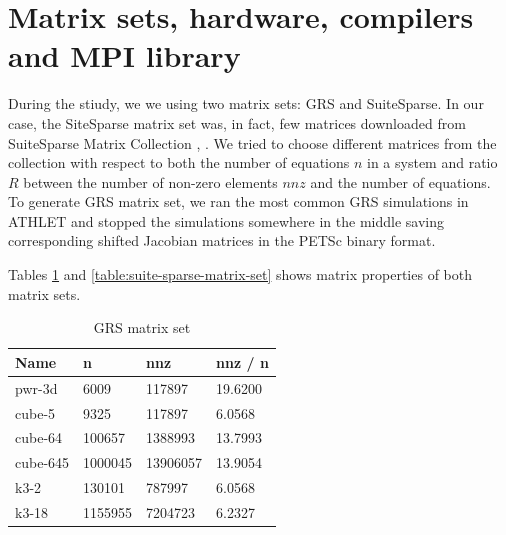 \section{Matrix sets, hardware, compilers and MPI library} \label{subseq:matrix-sets-and-hardware}

During the stiudy, we we using two matrix sets: GRS and SuiteSparse. In our case, the SiteSparse matrix set was, in fact, few matrices downloaded from SuiteSparse Matrix Collection \cite{sparse-matrix-collection:1}, \cite{sparse-matrix-collection:2}. We tried to choose different matrices from the collection with respect to both the number of equations $n$ in a system and ratio $R$ between the number of non-zero elements $nnz$ and the number of equations.\\ 


To generate GRS matrix set, we ran the most common GRS simulations in ATHLET and stopped the simulations somewhere in the middle saving corresponding shifted Jacobian matrices in the PETSc binary format.\\

Tables \ref{table:grs-matrix-set}  and \ref{table:suite-sparse-matrix-set} shows matrix properties of both matrix sets.\\

\begin{table}[ht]
\centering
\begin{tabular}{|l|l|l|l|}
\hline
Name     & n       & nnz      & nnz / n \\ \hline
pwr-3d   & 6009    & 117897   & 19.6200 \\ \hline
cube-5   & 9325    & 117897   & 6.0568  \\ \hline
cube-64  & 100657  & 1388993  & 13.7993 \\ \hline
cube-645 & 1000045 & 13906057 & 13.9054 \\ \hline
k3-2     & 130101  & 787997   & 6.0568  \\ \hline
k3-18    & 1155955 & 7204723  & 6.2327  \\ \hline
\end{tabular}
\caption{GRS matrix set}
\label{table:grs-matrix-set}
\end{table}




